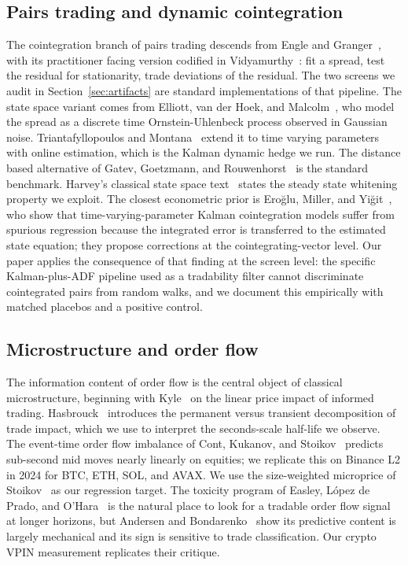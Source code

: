 \documentclass[11pt]{article}
\begin{document}
\subsection{Pairs trading and dynamic cointegration}
\label{sec:related-pairs}

The cointegration branch of pairs trading descends from Engle and
Granger~\cite{engle1987cointegration}, with its practitioner facing version codified in
Vidyamurthy~\cite{vidyamurthy2004pairs}: fit a spread, test the residual for stationarity,
trade deviations of the residual. The two screens we audit in Section~\ref{sec:artifacts}
are standard implementations of that pipeline. The state space variant comes from Elliott,
van der Hoek, and Malcolm~\cite{elliott2005pairs}, who model the spread as a discrete time
Ornstein-Uhlenbeck process observed in Gaussian noise. Triantafyllopoulos and
Montana~\cite{triantafyllopoulos2011dynamic} extend it to time varying parameters with
online estimation, which is the Kalman dynamic hedge we run. The distance based
alternative of Gatev, Goetzmann, and Rouwenhorst~\cite{gatev2006pairs} is the standard
benchmark.
Harvey's classical state space text~\cite{harvey1989structural} states the steady state
whitening property we exploit. The closest econometric prior is Ero\u{g}lu, Miller, and
Yi\u{g}it~\cite{eroglu2022tvc}, who show that time-varying-parameter Kalman cointegration
models suffer from spurious regression because the integrated error is transferred to the
estimated state equation; they propose corrections at the cointegrating-vector level. Our
paper applies the consequence of that finding at the screen level: the specific
Kalman-plus-ADF pipeline used as a tradability filter cannot discriminate cointegrated
pairs from random walks, and we document this empirically with matched placebos and a
positive control.

\subsection{Microstructure and order flow}
\label{sec:related-micro}

The information content of order flow is the central object of classical microstructure,
beginning with Kyle~\cite{kyle1985continuous} on the linear price impact of informed
trading. Hasbrouck~\cite{hasbrouck1991measuring} introduces the permanent versus transient
decomposition of trade impact, which we use to interpret the seconds-scale half-life we
observe. The event-time order flow imbalance of Cont, Kukanov, and
Stoikov~\cite{contkukanovstoikov2014} predicts sub-second mid moves nearly linearly on
equities; we replicate this on Binance L2 in 2024 for BTC, ETH, SOL, and AVAX. We use the
size-weighted microprice of Stoikov~\cite{stoikov2018microprice} as our regression target.
The toxicity program of Easley, L\'opez de Prado, and O'Hara~\cite{easley2012vpin} is the
natural place to look for a tradable order flow signal at longer horizons, but Andersen and
Bondarenko~\cite{andersen2014vpin} show its predictive content is largely mechanical and
its sign is sensitive to trade classification. Our crypto VPIN measurement replicates their
critique.
\end{document}
